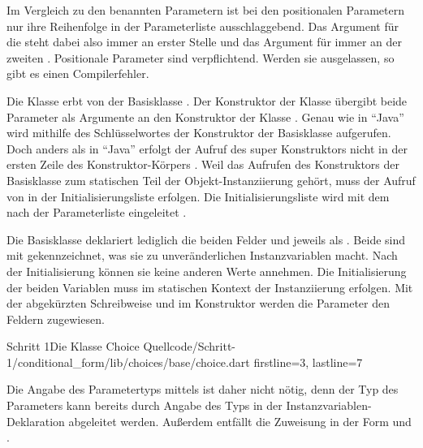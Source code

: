 Im Vergleich zu den benannten Parametern ist bei den positionalen Parametern nur ihre Reihenfolge in der Parameterliste ausschlaggebend.
Das Argument für die  steht dabei also immer an erster Stelle und das Argument für  immer an der zweiten .
Positionale Parameter sind verpflichtend.
Werden sie ausgelassen, so gibt es einen Compilerfehler.

Die Klasse  erbt von der Basisklasse  .
Der Konstruktor der Klasse  übergibt beide Parameter als Argumente an den Konstruktor der Klasse .
Genau wie in \enquote{Java} wird mithilfe des Schlüsselwortes  der Konstruktor der Basisklasse aufgerufen.
Doch anders als in \enquote{Java} erfolgt der Aufruf des super Konstruktors nicht in der ersten Zeile des Konstruktor-Körpers .
Weil das Aufrufen des Konstruktors der Basisklasse zum statischen Teil der Objekt-Instanziierung gehört, muss der Aufruf von  in der Initialisierungsliste erfolgen.
Die Initialisierungsliste wird mit dem \IC{:} nach der Parameterliste eingeleitet .

Die Basisklasse  \Lst{\ref{lst:Schritt1KlasseChoice}} deklariert lediglich die beiden Felder  und  jeweils als  .
Beide sind mit  gekennzeichnet, was sie zu unveränderlichen Instanzvariablen macht.
Nach der Initialisierung können sie keine anderen Werte annehmen.
 Die Initialisierung der beiden Variablen muss im statischen Kontext der Instanziierung erfolgen.
Mit der abgekürzten Schreibweise  und   im Konstruktor  werden die Parameter den Feldern zugewiesen.

\begin{alexlisting}{Schritt 1}{Die Klasse Choice}
  {Quellcode/Schritt-1/conditional_form/lib/choices/base/choice.dart}
  {firstline=3, lastline=7}
  \label{lst:Schritt1KlasseChoice}
\end{alexlisting}

Die Angabe des Parametertyps mittels  ist daher nicht nötig,
denn der Typ des Parameters kann bereits durch Angabe des Typs in der Instanzvariablen-Deklaration  abgeleitet werden.
Außerdem entfällt die Zuweisung in der Form  und
. 


